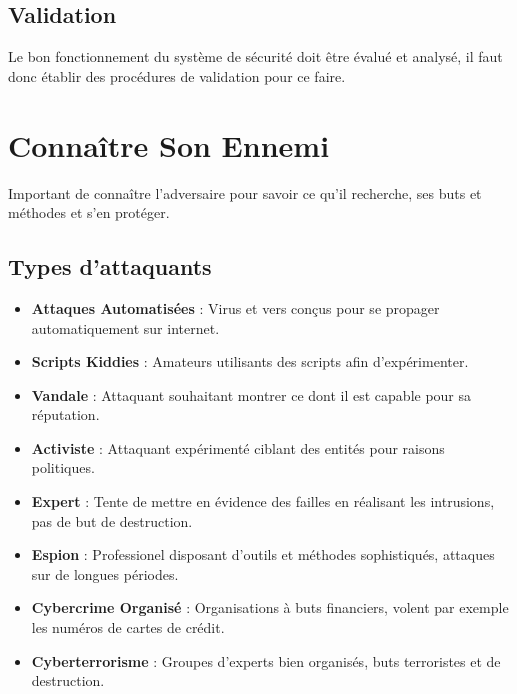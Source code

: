 \documentclass{report}
\begin{document}
		\subsection{Validation}

			Le bon fonctionnement du système de sécurité doit être évalué et analysé, il faut donc établir des procédures de validation pour ce faire.\\

	\section{Connaître Son Ennemi}

		Important de connaître l'adversaire pour savoir ce qu'il recherche, ses buts et méthodes et s'en protéger.\\

		\subsection{Types d'attaquants}


			\begin{itemize}
				\item \textbf{Attaques Automatisées} : Virus et vers conçus pour se propager automatiquement sur internet.

				\item \textbf{Scripts Kiddies} : Amateurs utilisants des scripts afin d'expérimenter.

				\item \textbf{Vandale} : Attaquant souhaitant montrer ce dont il est capable pour sa réputation.

				\item \textbf{Activiste} : Attaquant expérimenté ciblant des entités pour raisons politiques.

				\item \textbf{Expert} : Tente de mettre en évidence des failles en réalisant les intrusions, pas de but de destruction.

				\item \textbf{Espion} : Professionel disposant d'outils et méthodes sophistiqués, attaques sur de longues périodes.

				\item \textbf{Cybercrime Organisé} : Organisations à buts financiers, volent par exemple les numéros de cartes de crédit.

				\item \textbf{Cyberterrorisme} : Groupes d'experts bien organisés, buts terroristes et de destruction.\\
			\end{itemize}
\end{document}
